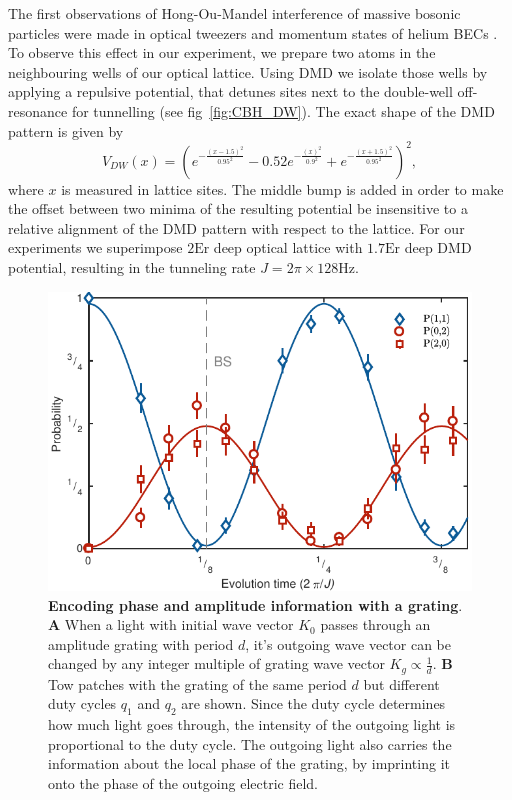 The first observations of Hong-Ou-Mandel interference of massive bosonic particles were made in optical tweezers \cite{Kaufman2014} and momentum states of helium BECs \cite{Lopes2015}. To observe this effect in our experiment, we prepare two atoms in the neighbouring wells of our optical lattice. Using DMD we isolate those wells by applying a repulsive potential, that detunes sites next to the double-well off-resonance for tunnelling (see fig~\ref{fig:CBH_DW}). The exact shape of the DMD pattern is given by
\begin{equation}
V_{DW}(x) = (e^{-\frac{(x-1.5)^2}{0.95^2}} - 0.52e^{-\frac{(x)^2}{0.9^2}} + e^{-\frac{(x+1.5)^2}{0.95^2}})^2,
\end{equation}
where $x$ is measured in lattice sites. The middle bump is added in order to make the offset between two minima of the resulting potential be insensitive to a relative alignment of the DMD pattern with respect to the lattice. For our experiments we superimpose $2\textrm{Er}$ deep optical lattice with $1.7\textrm{Er}$ deep DMD potential, resulting in the tunneling rate $J = 2 \pi \times 128 \textrm{Hz}$.

\begin{figure}[t]
	\centering
	\includegraphics[scale=1]{figures/CBH_HOM.pdf}
	\caption{{\bf Encoding phase and amplitude information with a grating}. {\bf A} When a light with initial wave vector $K_0$ passes through an amplitude grating with period $d$, it's outgoing wave vector can be changed by any integer multiple of grating wave vector $K_g\propto \frac{1}{d}$. {\bf B} Tow patches with the grating of the same period $d$ but different duty cycles $q_1$ and $q_2$ are shown. Since the duty cycle determines how much light goes through, the intensity of the outgoing light is proportional to the duty cycle. The outgoing light also carries the information about the local phase of the grating, by imprinting it onto the phase of the outgoing electric field.}
	\label{fig:CBH_HOM}
\end{figure}

